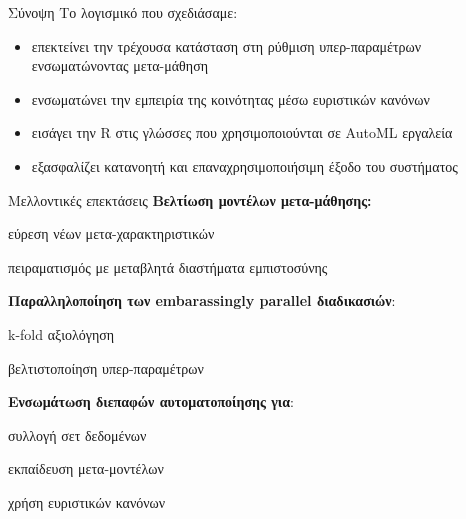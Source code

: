 \documentclass{beamer}
\newcommand{\bigqm}[1][1]{\text{\larger[#1]{\textbf{?}}}}
\begin{document}
  \begin{frame}{Σύνοψη} 
   Το λογισμικό που σχεδιάσαμε: 
  	\begin{itemize}
  		\item επεκτείνει την τρέχουσα κατάσταση στη ρύθμιση υπερ-παραμέτρων ενσωματώνοντας μετα-μάθηση
  		\item ενσωματώνει την εμπειρία της κοινότητας μέσω ευριστικών κανόνων
  		\item εισάγει την R στις γλώσσες που χρησιμοποιούνται σε AutoML εργαλεία
  		\item εξασφαλίζει κατανοητή και επαναχρησιμοποιήσιμη έξοδο του συστήματος 
  	\end{itemize}
  \end{frame}
  \begin{frame}{Μελλοντικές επεκτάσεις} 
  	\textbf{Βελτίωση μοντέλων μετα-μάθησης:}
  	\begin{itemize}
  		{\small
  			 \item εύρεση νέων μετα-χαρακτηριστικών
  			\item πειραματισμός με μεταβλητά διαστήματα εμπιστοσύνης}
  		
  		\end{itemize}  	
  		
  	\textbf{Παραλληλοποίηση των embarassingly parallel διαδικασιών}:
  	\begin{itemize}
  		{\small
  		\item k-fold αξιολόγηση
  		\item βελτιστοποίηση υπερ-παραμέτρων	}
  		 
  	\end{itemize}  	   	  	
  	\textbf{Ενσωμάτωση διεπαφών αυτοματοποίησης για}:
  	\begin{itemize}
  		{\small
  			\item συλλογή σετ δεδομένων
  			\item εκπαίδευση μετα-μοντέλων
  			\item χρήση ευριστικών κανόνων}  		
  	\end{itemize}
  \end{frame}  
  \begin{frame}[standout]{} 
    \begin{center}
    	  	\scalebox{2}{
    $\bigqm[7]$}
    \end{center}
  \end{frame}
  \begin{frame}[allowframebreaks]{}
\nocite{*}
\printbibliography[title=Bιβλιογραφία ]
  \end{frame} 
\end{document}
